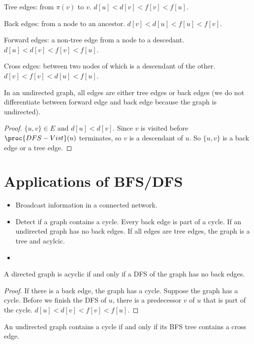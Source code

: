 Tree edges: from $\pi(v)$ to $v$. $d[u] < d[v] < f[v] < f[u]$.

Back edges: from a node to an ancestor. $d[v] < d[u] < f[u] < f[v]$.

Forward edges: a non-tree edge from a node to a descedant. $d[u] < d[v] < f[v] < f[u]$.

Cross edges: between two nodes of which is a descendant of the other. $d[v] < f[v] < d[u] < f[u]$.

\begin{theorem}
    In an undirected graph, all edges are either tree edges or back edges (we do not differentiate between forward edge and back edge because the graph is undirected).
\end{theorem}

\begin{proof}
    $\{u,v\} \in E$ and $d[u] < d[v]$. Since $v$ is visited before $\proc{DFS-Vist}(u)$ terminates, so $v$ is a descendant of $u$. So $\{u,v\}$ is a back edge or a tree edge.
\end{proof}

\section{Applications of BFS/DFS}

\begin{itemize}
    \item Broadcast information in a connected network.
    \item Detect if a graph contains a cycle. Every back edge is part of a cycle. If an undirected graph has no back edges. If all edges are tree edges, the graph is a tree and acylcic. 
    \item 
\end{itemize}

\begin{lemma}
    A directed graph is acyclic if and only if a DFS of the graph has no back edges.
\end{lemma}

\begin{proof}
    If there is a back edge, the graph has a cycle. Suppose the graph has a cycle. Before we finish the DFS of $u$, there is a predecessor $v$ of $u$ that is part of the cycle. $d[u] < d[v] < f[v] < f[u]$.
\end{proof}

\begin{lemma}
    An undirected graph contains a cycle if and only if its BFS tree contains a cross edge.
\end{lemma}